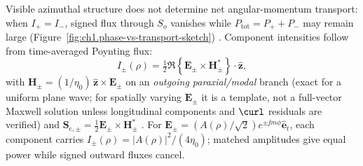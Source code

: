 Visible azimuthal structure does not determine net angular-momentum transport: when \(I_+=I_-\), signed flux through $S_o$ vanishes while $P_{\mathrm{tot}}=P_++P_-$ may remain large (Figure~\ref{fig:ch1.phase-vs-transport-sketch}) \cite{beth1936,stratton1941}. Component intensities follow from time-averaged Poynting flux:
\begin{equation}
\label{eq:ch1.ex62-intensity-definition}
I_\pm(\rho)=\tfrac12\Re\!\left\{\mathbf{E}_\pm\times\mathbf{H}_\pm^*\right\}\cdot\hat{\mathbf{z}},
\end{equation}
with $\mathbf{H}_\pm=(1/\eta_0)\,\hat{\mathbf{z}}\times\mathbf{E}_\pm$ on an \emph{outgoing paraxial/modal} branch (exact for a uniform plane wave; for spatially varying $\mathbf{E}_\pm$ it is a template, not a full-vector Maxwell solution unless longitudinal components and $\curl$ residuals are verified) and $\mathbf{S}_{\mathrm{c},\pm}=\tfrac12\mathbf{E}_\pm\times\mathbf{H}_\pm^*$ \cite{stratton1941,allen1992}. For
$\mathbf{E}_\pm=(A(\rho)/\sqrt{2})e^{\pm\jj m\phi}\hat{\mathbf{e}}_t$, each component carries
$I_\pm(\rho)=|A(\rho)|^2/(4\eta_0)$; matched amplitudes give equal power while signed outward fluxes cancel.

